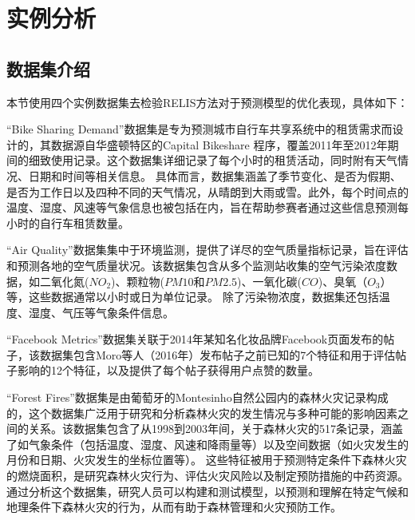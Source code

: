 \documentclass[12pt,a4paper]{article}%
\begin{document}
	\section{实例分析}
		
	\subsection{数据集介绍}
	本节使用四个实例数据集去检验RELIS方法对于预测模型的优化表现\cite{bib27,bib28,bib29,bib30}，具体如下：
	
	“Bike Sharing Demand”数据集是专为预测城市自行车共享系统中的租赁需求而设计的，其数据源自华盛顿特区的Capital Bikeshare 程序，覆盖2011年至2012年期间的细致使用记录。这个数据集详细记录了每个小时的租赁活动，同时附有天气情况、日期和时间等相关信息。
	具体而言，数据集涵盖了季节变化、是否为假期、是否为工作日以及四种不同的天气情况，从晴朗到大雨或雪。此外，每个时间点的温度、湿度、风速等气象信息也被包括在内，旨在帮助参赛者通过这些信息预测每小时的自行车租赁数量。
	
	“Air Quality”数据集集中于环境监测，提供了详尽的空气质量指标记录，旨在评估和预测各地的空气质量状况。该数据集包含从多个监测站收集的空气污染浓度数据，如二氧化氮($NO_2$)、颗粒物($PM10$和$PM2.5$)、一氧化碳($CO$)、臭氧（$O_3$）等，这些数据通常以小时或日为单位记录。
	除了污染物浓度，数据集还包括温度、湿度、气压等气象条件信息。
	
	“Facebook Metrics”数据集关联于2014年某知名化妆品牌Facebook页面发布的帖子，该数据集包含Moro等人（2016年）发布帖子之前已知的7个特征和用于评估帖子影响的12个特征，以及提供了每个帖子获得用户点赞的数量。
	
	“Forest Fires”数据集是由葡萄牙的Montesinho自然公园内的森林火灾记录构成的，这个数据集广泛用于研究和分析森林火灾的发生情况与多种可能的影响因素之间的关系。该数据集包含了从1998到2003年间，关于森林火灾的517条记录，涵盖了如气象条件（包括温度、湿度、风速和降雨量等）以及空间数据（如火灾发生的月份和日期、火灾发生的坐标位置等）。
	这些特征被用于预测特定条件下森林火灾的燃烧面积，是研究森林火灾行为、评估火灾风险以及制定预防措施的中药资源。通过分析这个数据集，研究人员可以构建和测试模型，以预测和理解在特定气候和地理条件下森林火灾的行为，从而有助于森林管理和火灾预防工作。
		
\end{document}
